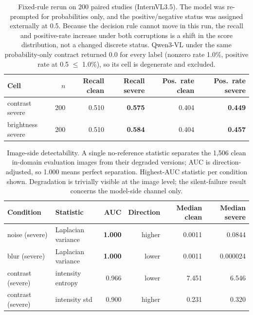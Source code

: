 \begin{table}[H]
\centering
\small
\caption{Fixed-rule rerun on 200 paired studies (InternVL3.5). The model was re-prompted for probabilities only, and the positive/negative status was assigned externally at 0.5. Because the decision rule cannot move in this run, the recall and positive-rate increase under both corruptions is a shift in the score distribution, not a changed discrete status. Qwen3-VL under the same probability-only contract returned 0.0 for every label (nonzero rate 1.0\%, positive rate at 0.5 $\le$ 1.0\%), so its cell is degenerate and excluded.}
\label{tab:fixedrerun}
\begin{tabular}{lrrrrr}
\toprule
Cell & $n$ & Recall clean & Recall severe & Pos.\ rate clean & Pos.\ rate severe \\
\midrule
contrast severe & 200 & 0.510 & \textbf{0.575} & 0.404 & \textbf{0.449} \\
brightness severe & 200 & 0.510 & \textbf{0.584} & 0.404 & \textbf{0.457} \\
\bottomrule
\end{tabular}
\end{table}

\clearpage
\begin{table}[H]
\centering
\small
\caption{Image-side detectability. A single no-reference statistic separates the 1,506 clean in-domain evaluation images from their degraded versions; AUC is direction-adjusted, so 1.000 means perfect separation. Highest-AUC statistic per condition shown. Degradation is trivially visible at the image level; the silent-failure result concerns the model-side channel only.}
\label{tab:imageside}
\begin{tabular}{llrrrr}
\toprule
Condition & Statistic & AUC & Direction & Median clean & Median severe \\
\midrule
noise (severe) & Laplacian variance & \textbf{1.000} & higher & 0.0011 & 0.0844 \\
blur (severe) & Laplacian variance & \textbf{1.000} & lower & 0.0011 & 0.000024 \\
contrast (severe) & intensity entropy & 0.966 & lower & 7.451 & 6.546 \\
contrast (severe) & intensity std & 0.900 & higher & 0.231 & 0.320 \\
\bottomrule
\end{tabular}
\end{table}

